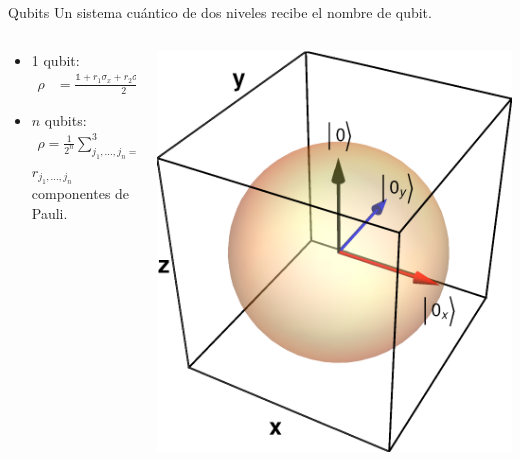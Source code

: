 \documentclass[xcolor=dvipsnames,presentation]{beamer}%
\begin{document}
\begin{frame}{Qubits}
Un sistema cuántico de dos niveles recibe el nombre de qubit. \vfill

	\begin{columns}	\hspace{.4cm}
	\begin{column}{0.6\textwidth}
	\begin{itemize}
		\item 1 qubit:
		\begin{align*}
			\rho &= \frac{\mathds{1}+r_1\sigma_x+r_2\sigma_y+r_3\sigma_z}{2}.
		\end{align*}	
		\item $n$ qubits:
		\begin{align*}
		\rho = \frac{1}{2^n}\sum _{j_1,\ldots,j_n=0}^3 r_{j_1,\ldots,j_n}
		\sigma_{j_1}\otimes \ldots
		\otimes\sigma_{j_n},%
		\end{align*}
		$r_{j_1,\ldots,j_n}$ componentes de Pauli.
	\end{itemize} \vfill
	\end{column}%
	\begin{column}{0.4\textwidth}  
  		\begin{center}
    		\includegraphics[width=.85\textwidth]{bloch_sphere}      

\end{center}
\end{column}
\end{columns}
\end{frame}
\end{document}
